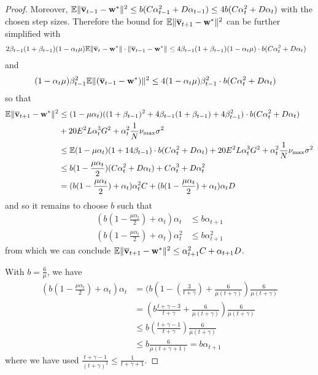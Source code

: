 \begin{proof}
Moreover, $\mathbb{E}\|{\overline{\mathbf{v}}}_{t-1}-{\mathbf{w}}^{\ast}\|^{2}\leq b(C\alpha_{t-1}^{2}+D\alpha_{t-1})\leq 4b(C\alpha_{t}^{2}+D\alpha_{t})$
with the chosen step sizes.
Therefore the bound for $\mathbb{E}\|{\overline{\mathbf{v}}}_{t+1}-{\mathbf{w}}^{\ast}\|^{2}$
can be further simplified with 
\begin{align*}
2\beta_{t-1}(1+\beta_{t-1})(1-\alpha_{t}\mu)\mathbb{E}\|{\overline{\mathbf{v}}}_{t}-{\mathbf{w}}^{\ast}\|\cdot\|{\overline{\mathbf{v}}}_{t-1}-{\mathbf{w}}^{\ast}\| & \leq4\beta_{t-1}(1+\beta_{t-1})(1-\alpha_{t}\mu)\cdot b(C\alpha_{t}^{2}+D\alpha_{t})
\end{align*}
and 
\begin{align*}
(1-\alpha_{t}\mu)\beta_{t-1}^{2}\mathbb{E}\|({\overline{\mathbf{v}}}_{t-1}-{\mathbf{w}}^{\ast})\|^{2} & \leq4(1-\alpha_{t}\mu)\beta_{t-1}^{2}\cdot b(C\alpha_{t}^{2}+D\alpha_{t})
\end{align*}
so that
\begin{align*}
\mathbb{E}\|{\overline{\mathbf{v}}}_{t+1}-{\mathbf{w}}^{\ast}\|^{2} & \leq(1-\mu\alpha_{t})((1+\beta_{t-1})^{2}+4\beta_{t-1}(1+\beta_{t-1})+4\beta_{t-1}^{2})\cdot b(C\alpha_{t}^{2}+D\alpha_{t})\\
& +20E^{2}L\alpha_{t}^{3}G^{2}+\alpha_{t}^{2}\frac{1}{N}\nu_{\max}\sigma^{2}\\
& \leq\mathbb{E}(1-\mu\alpha_{t})(1+14\beta_{t-1})\cdot b(C\alpha_{t}^{2}+D\alpha_{t})+20E^{2}L\alpha_{t}^{3}G^{2}+\alpha_{t}^{2}\frac{1}{N}\nu_{\max}\sigma^{2}\\
& \leq b(1-\frac{\mu\alpha_{t}}{2})(C\alpha_{t}^{2}+D\alpha_{t})+C\alpha_{t}^{3}+D\alpha_{t}^{2}\\
& =(b(1-\frac{\mu\alpha_{t}}{2})+\alpha_{t})\alpha_{t}^{2}C+(b(1-\frac{\mu\alpha_{t}}{2})+\alpha_{t})\alpha_{t}D
\end{align*}
and so it remains to choose $b$ such that 
\begin{align*}
(b(1-\frac{\mu\alpha_{t}}{2})+\alpha_{t})\alpha_{t} & \leq b\alpha_{t+1}\\
(b(1-\frac{\mu\alpha_{t}}{2})+\alpha_{t})\alpha_{t}^{2} & \leq b\alpha_{t+1}^{2}
\end{align*}
from which we can conclude $\mathbb{E}\|{\overline{\mathbf{v}}}_{t+1}-{\mathbf{w}}^{\ast}\|^{2}\leq\alpha_{t+1}^{2}C+\alpha_{t+1}D$.

With $b=\frac{6}{\mu}$, we have
\begin{align*}
(b(1-\frac{\mu\alpha_{t}}{2})+\alpha_{t})\alpha_{t} & =(b(1-(\frac{3}{t+\gamma})+\frac{6}{\mu(t+\gamma)})\frac{6}{\mu(t+\gamma)}\\
& =(b\frac{t+\gamma-3}{t+\gamma}+\frac{6}{\mu(t+\gamma)})\frac{6}{\mu(t+\gamma)}\\
& \leq b(\frac{t+\gamma-1}{t+\gamma})\frac{6}{\mu(t+\gamma)}\\
& \leq b\frac{6}{\mu(t+\gamma+1)}=b\alpha_{t+1}
\end{align*}
where we have used $\frac{t+\gamma-1}{(t+\gamma)^{2}}\leq\frac{1}{t+\gamma+1}$.


\end{proof}
